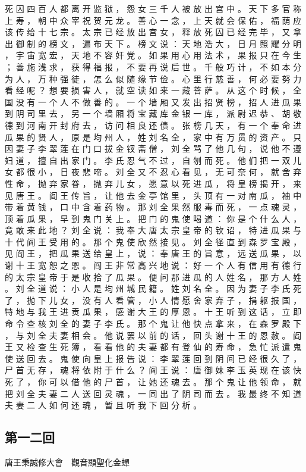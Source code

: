 {死 囚 四 百 人 都 离 开 监 狱 ， 怨 女 三 千 人 被 放 出 宫 中 。
天 下 多 官 称 上 寿 ， 朝 中 众 宰 祝 贺 元 龙 。
善 心 一 念 ， 上 天 就 会 保 佑 ， 福 荫 应 该 传 给 十 七 宗 。
太 宗 已 经 放 出 宫 女 ， 释 放 死 囚 已 经 完 毕 ， 又 拿 出 御 制 的 榜 文 ， 遍 布 天 下 。
榜 文 说 ： 天 地 浩 大 ， 日 月 照 耀 分 明 ， 宇 宙 宽 宏 ， 天 地 不 容 奸 党 。
如 果 用 心 用 法 术 ， 果 报 只 在 今 生 ； 善 施 浅 求 ， 获 得 福 报 ， 不 要 再 说 后 世 。
千 般 巧 计 ， 不 如 本 分 为 人 ， 万 种 强 徒 ， 怎 么 似 随 缘 节 俭 。
心 里 行 慈 善 ， 何 必 要 努 力 看 经 呢 ？ 想 要 损 害 人 ， 就 空 读 如 来 一 藏 菩 萨 。 从 这 个 时 候 ， 全 国 没 有 一 个 人 不 做 善 的 。
一 个 墙 厢 又 发 出 招 贤 榜 ， 招 人 进 瓜 果 到 阴 司 里 去 ， 另 一 个 墙 厢 将 宝 藏 库 金 银 一 库 ， 派 尉 迟 恭 、 胡 敬 德 到 河 南 开 封 府 去 ， 访 问 相 良 还 债 。
张 榜 几 天 ， 有 一 个 奉 命 进 瓜 果 的 贤 人 ， 原 是 均 州 人 ， 姓 刘 名 全 ， 家 中 有 万 贯 的 资 产 。
只 因 妻 子 李 翠 莲 在 门 口 拔 金 钗 斋 僧 ， 刘 全 骂 了 他 几 句 ， 说 他 不 遵 妇 道 ， 擅 自 出 家 门 。
李 氏 忍 气 不 过 ， 自 刎 而 死 。
他 们 把 一 双 儿 女 都 很 小 ， 日 夜 悲 啼 。
刘 全 又 不 忍 心 看 见 ， 无 可 奈 何 ， 就 舍 弃 性 命 ， 抛 弃 家 眷 ， 抛 弃 儿 女 ， 愿 意 以 死 进 瓜 ， 将 皇 榜 揭 开 ， 来 见 唐 王 。
阎 王 传 旨 ， 让 他 去 金 亭 馆 里 ， 头 顶 有 一 对 南 瓜 ， 袖 中 带 着 黄 钱 ， 口 中 含 着 药 物 。
那 刘 全 果 然 服 毒 而 死 ， 一 点 魂 灵 ， 顶 着 瓜 果 ， 早 到 鬼 门 关 上 。
把 门 的 鬼 使 喝 道 ： 你 是 个 什 么 人 ， 竟 敢 来 此 地 ？ 刘 全 说 ： 我 奉 大 唐 太 宗 皇 帝 的 钦 诏 ， 特 进 瓜 果 与 十 代 阎 王 受 用 的 。
那 个 鬼 使 欣 然 接 见 。
刘 全 径 直 到 森 罗 宝 殿 ， 见 阎 王 ， 把 瓜 果 送 给 皇 上 ， 说 ： 奉 唐 王 的 旨 意 ， 远 送 瓜 果 ， 以 谢 十 王 宽 恕 之 恩 。
阎 王 非 常 高 兴 地 说 ： 好 一 个 人 有 信 用 有 德 行 的 太 宗 皇 帝 于 是 收 拾 了 瓜 果 。
便 问 那 进 瓜 的 人 姓 名 ， 那 方 人 姓 。
刘 全 道 说 ： 小 人 是 均 州 城 民 籍 。
姓 刘 名 全 。
因 为 妻 子 李 氏 死 了 ， 抛 下 儿 女 ， 没 有 人 看 管 ， 小 人 情 愿 舍 家 弃 子 ， 捐 躯 报 国 ， 特 地 与 我 王 进 贡 瓜 果 ， 感 谢 大 王 的 厚 恩 。
十 王 听 到 这 话 ， 立 即 命 令 查 核 刘 全 的 妻 子 李 氏 。
那 个 鬼 让 他 快 点 拿 来 ， 在 森 罗 殿 下 ， 与 刘 全 夫 妻 相 会 。
他 说 罢 以 前 的 话 ， 回 头 谢 十 王 的 恩 赦 。
阎 王 又 检 查 生 死 簿 ， 看 看 他 的 夫 妻 都 有 登 仙 的 寿 命 ， 急 忙 派 遣 鬼 使 送 回 去 。
鬼 使 向 皇 上 报 告 说 ： 李 翠 莲 回 到 阴 间 已 经 很 久 了 ， 尸 首 无 存 ， 魂 将 依 附 于 什 么 ？ 阎 王 说 ： 唐 御 妹 李 玉 英 现 在 该 快 死 了 ， 你 可 以 借 他 的 尸 首 ， 让 她 还 魂 去 。
那 个 鬼 让 他 领 命 ， 就 把 刘 全 夫 妻 二 人 送 回 灵 魂 ， 一 同 出 了 阴 司 而 去 。
我 最 终 不 知 道 夫 妻 二 人 如 何 还 魂 ， 暂 且 听 我 下 回 分 析 。
}\switchcolumn\flushpage  \begin{pinyinscope}{\myfontt \section{第一二回}     唐王秉誠修大會　觀音顯聖化金蟬

}
\end{pinyinscope}
